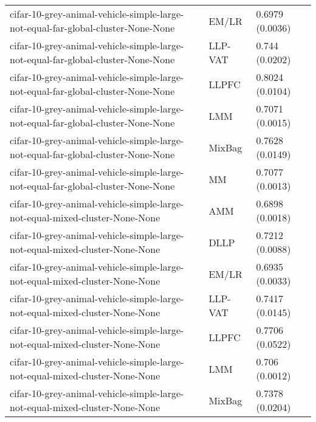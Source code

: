 \begin{longtable}{lll}
                             cifar-10-grey-animal-vehicle-simple-large-not-equal-far-global-cluster-None-None &     EM/LR &                           0.6979 (0.0036) \\
                             cifar-10-grey-animal-vehicle-simple-large-not-equal-far-global-cluster-None-None &   LLP-VAT &                            0.744 (0.0202) \\
                             cifar-10-grey-animal-vehicle-simple-large-not-equal-far-global-cluster-None-None &     LLPFC &                           0.8024 (0.0104) \\
                             cifar-10-grey-animal-vehicle-simple-large-not-equal-far-global-cluster-None-None &       LMM &                           0.7071 (0.0015) \\
                             cifar-10-grey-animal-vehicle-simple-large-not-equal-far-global-cluster-None-None &    MixBag &                           0.7628 (0.0149) \\
                             cifar-10-grey-animal-vehicle-simple-large-not-equal-far-global-cluster-None-None &        MM &                           0.7077 (0.0013) \\
                                  cifar-10-grey-animal-vehicle-simple-large-not-equal-mixed-cluster-None-None &       AMM &                           0.6898 (0.0018) \\
                                  cifar-10-grey-animal-vehicle-simple-large-not-equal-mixed-cluster-None-None &      DLLP &                           0.7212 (0.0088) \\
                                  cifar-10-grey-animal-vehicle-simple-large-not-equal-mixed-cluster-None-None &     EM/LR &                           0.6935 (0.0033) \\
                                  cifar-10-grey-animal-vehicle-simple-large-not-equal-mixed-cluster-None-None &   LLP-VAT &                           0.7417 (0.0145) \\
                                  cifar-10-grey-animal-vehicle-simple-large-not-equal-mixed-cluster-None-None &     LLPFC &                           0.7706 (0.0522) \\
                                  cifar-10-grey-animal-vehicle-simple-large-not-equal-mixed-cluster-None-None &       LMM &                            0.706 (0.0012) \\
                                  cifar-10-grey-animal-vehicle-simple-large-not-equal-mixed-cluster-None-None &    MixBag &                           0.7378 (0.0204) \\

\end{longtable}
